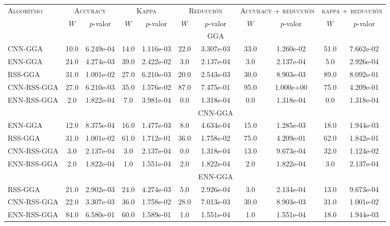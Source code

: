 \begin{table}[]
\centering
\begin{adjustbox}{max width =\textwidth}
\begin{tabular}{l c c c c c c c c c c}
\hline
\multirow{2}{*}{\textsc{Algoritmo}}
	& \multicolumn{2}{c}{\textsc{Accuracy}}
	& \multicolumn{2}{c}{\textsc{Kappa}}
	& \multicolumn{2}{c}{\textsc{Reducción}} 
	& \multicolumn{2}{c}{\textsc{Accuracy + reducción}} 
	& \multicolumn{2}{c}{\textsc{kappa + reducción}} \\
 & $W$ & $p$-valor & $W$ & $p$-valor & $W$ & $p$-valor & $W$ & $p$-valor & $W$ & $p$-valor \\
\hline
\hline

 & & & & & & GGA & & & & \\

CNN-GGA  & 10.0 & 6.249e-04 & 14.0 & 1.116e-03 & 22.0 & 3.307e-03 & 33.0 & 1.260e-02 & 51.0 & 7.662e-02 \\
ENN-GGA & 24.0 & 4.274e-03 & 39.0 & 2.422e-02 & 3.0 & 2.137e-04 & 3.0 & 2.137e-04 & 5.0 & 2.926e-04 \\
RSS-GGA  & 31.0 & 1.001e-02 & 27.0 & 6.210e-03 & 20.0 & 2.543e-03 & 30.0 & 8.903e-03 & 89.0 & 8.092e-01 \\
CNN-RSS-GGA  & 27.0 & 6.210e-03 & 35.0 & 1.576e-02 & 87.0 & 7.475e-01 & 95.0 & 1.000e+00 & 75.0 & 4.209e-01 \\
ENN-RSS-GGA & 2.0 & 1.822e-04 & 7.0 & 3.981e-04 & 0.0 & 1.318e-04 & 0.0 & 1.318e-04 & 0.0 & 1.318e-04 \\

\hline

 & & & & & & CNN-GGA & & & & \\
ENN-GGA  & 12.0 & 8.375e-04 & 16.0 & 1.477e-03 & 8.0 & 4.634e-04 & 15.0 & 1.285e-03 & 18.0 & 1.944e-03 \\ 
RSS-GGA  & 31.0 & 1.001e-02 & 61.0 & 1.712e-01 & 36.0 & 1.758e-02 & 75.0 & 4.209e-01 & 62.0 & 1.842e-01 \\ 
CNN-RSS-GGA & 3.0 & 2.137e-04 & 3.0 & 2.137e-04 & 0.0 & 1.318e-04 & 13.0 & 9.673e-04 & 32.0 & 1.124e-02 \\ 
ENN-RSS-GGA & 2.0 & 1.822e-04 & 1.0 & 1.551e-04 & 2.0 & 1.822e-04 & 2.0 & 1.822e-04 & 3.0 & 2.137e-04 \\ 

\hline

 & & & & & & ENN-GGA & & & & \\
RSS-GGA & 21.0 & 2.902e-03 & 24.0 & 4.274e-03 & 5.0 & 2.926e-04 & 3.0 & 2.134e-04 & 13.0 & 9.673e-04 \\ 
CNN-RSS-GGA & 22.0 & 3.307e-03 & 36.0 & 1.758e-02 & 28.0 & 7.013e-03 & 30.0 & 8.903e-03 & 31.0 & 1.001e-02 \\ 
ENN-RSS-GGA & 84.0 & 6.580e-01 & 60.0 & 1.589e-01 & 1.0 & 1.551e-04 & 1.0 & 1.551e-04 & 18.0 & 1.944e-03 \\


\end{tabular}
\end{adjustbox}
\end{table}
